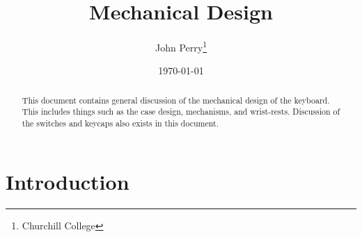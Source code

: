 \documentclass[11pt,a4paper]{article}
\title{Mechanical Design}
\author{John Perry\thanks{Churchill College}}
\date{\today}
\numberwithin{equation}{section}
\begin{document}
\pagestyle{empty}

\maketitle

\pagestyle{fancy}


\begin{abstract}
    This document contains general discussion of the mechanical design of the keyboard. This includes things such as the case design, mechanisms, and wrist-rests. Discussion of the switches and keycaps also exists in this document.
\end{abstract}

\section{Introduction}
\end{document}
